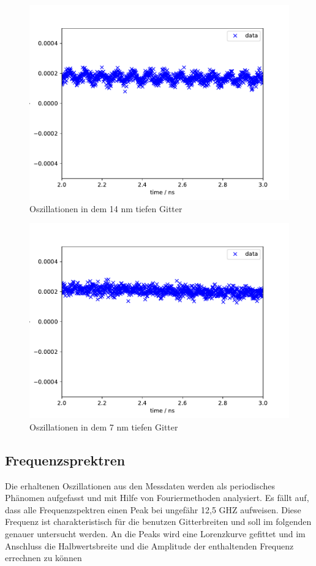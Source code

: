 \begin{figure}[h!]
 	\centering
 	\includegraphics[width=\textwidth]{img/007_a000_b0_e245_G2corr.pdf}
 	\caption{Oszillationen in dem 14 nm tiefen Gitter}
 	\label{abb:film}
\end{figure}

\begin{figure}[h!]
 	\centering
 	\includegraphics[width=\textwidth]{img/008_a000_b0_e245_G1corr.pdf}
 	\caption{Oszillationen in dem 7 nm tiefen Gitter}
 	\label{abb:film}
\end{figure}


\subsection{Frequenzsprektren}
Die erhaltenen Oszillationen aus den Messdaten werden als periodisches Phänomen aufgefasst und mit Hilfe von Fouriermethoden analysiert. Es fällt auf, dass alle Frequenzspektren einen Peak bei ungefähr 12,5 GHZ aufweisen. Diese Frequenz ist charakteristisch für die benutzen Gitterbreiten und soll im folgenden genauer untersucht werden. An die Peaks wird eine Lorenzkurve gefittet und im Anschluss die Halbwertsbreite und die Amplitude der enthaltenden Frequenz errechnen zu können

